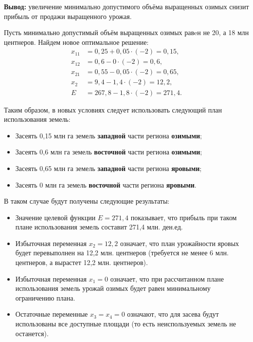 \textbf{Вывод:} увеличение минимально допустимого объёма выращенных озимых
снизит прибыль от продажи выращенного урожая.


Пусть минимально допустимый объём выращенных озимых равeн не 20, а 18 млн центнеров.
Найдем новое оптимальное решение: 
\begin{equation}
    \begin{aligned}
      x_{11} &= 0{,}25 + 0{,}05 \cdot (-2) = 0{,}15, \\
      x_{12} &= 0{,}6 - 0 \cdot (-2) = 0{,}6, \\
      x_{21} &= 0{,}55 - 0{,}05 \cdot (-2) = 0{,}65, \\
      x_{2} &= 9{,}4 - 1{,}4 \cdot (-2) = 12{,}2, \\
      E &= 267{,}8 - 1{,}8 \cdot (-2) = 271{,}4.
    \end{aligned}
\end{equation}

Таким образом, в новых условиях следует использовать следующий план использования земель:
\begin{itemize}
\item Засеять 0{,}15 млн га земель \textbf{западной} части региона \textbf{озимыми};
\item Засеять 0{,}6 млн га земель \textbf{восточной} части региона \textbf{озимыми};
\item Засеять 0{,}65 млн га земель \textbf{западной} части региона \textbf{яровыми};
\item Засеять 0 млн га земель \textbf{восточной} части региона \textbf{яровыми}.
\end{itemize}

В таком случае будут получены следующие результаты:
\begin{itemize}

\item Значение целевой функции $ E = 271{,}4 $ показывает, что прибыль при таком
  плане использования земель составит 271{,}4 млн. ден.ед.

\item Избыточная переменная $ x_{2} = 12{,}2 $ означает, что план урожайности яровых 
  будет перевыполнен на 12{,}2 млн. центнеров (требуется не менее 6 млн. центнеров, а
  вырастет 12{,}2 млн. центнеров).

\item Избыточная переменная $ x_{1} = 0 $ означает, что при рассчитанном плане использования
  земель урожай озимых будет равен минимальному ограничению плана.

\item Остаточные переменные $ x_{3} = x_{4} = 0 $ означают, что для засева будут
  использованы все доступные площади (то есть неиспользуемых земель не останется).
\end{itemize}


